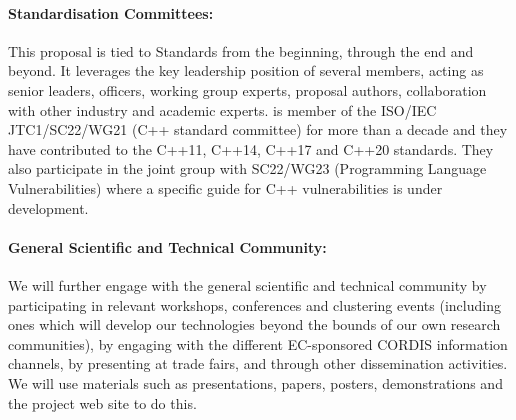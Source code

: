 \documentclass[a4paper,11pt]{article}
\begin{document}
\paragraph{Standardisation Committees:}
This proposal is tied to Standards from the beginning, through the end and beyond. It leverages the key leadership position of several members, acting as senior leaders, officers, working group experts, proposal authors, collaboration with other industry and academic experts.
\UCMshort{} is member of the ISO/IEC JTC1/SC22/WG21 (C++ standard committee) for more than a decade and they have contributed to the C++11, C++14, C++17 and C++20 standards. They also participate in the joint group with SC22/WG23 (Programming Language Vulnerabilities) where a specific guide for C++ vulnerabilities is under development.

%
%

\paragraph{General Scientific and Technical Community:}
We will further engage with the general scientific and technical community
 by participating in relevant workshops, conferences and clustering events (including ones which
 will develop our technologies beyond the bounds of our own research communities), by engaging with the
 different EC-sponsored CORDIS information channels, by presenting at trade
 fairs, and through other dissemination activities.  We will use materials such as presentations,
 papers,  posters, demonstrations and the project web site to do this.
\end{document}

